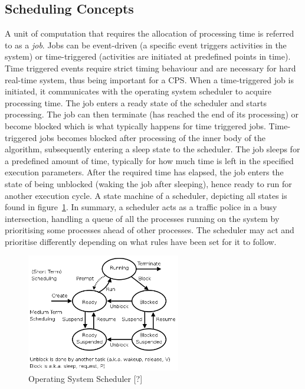 \subsection{Scheduling Concepts}
A unit of computation that requires the allocation of processing time is referred to as a \textit{job}. Jobs can be event-driven (a specific event triggers activities in the system) or time-triggered (activities are initiated at predefined points in time). Time triggered events require strict timing behaviour and are necessary for hard real-time system, thus being important for a CPS. When a time-triggered job is initiated, it communicates with the operating system scheduler to acquire processing time. The job enters a ready state of the scheduler and starts processing. The job can then terminate (has reached the end of its processing) or become blocked which is what typically happens for time triggered jobs. Time-triggered jobs becomes blocked after processing of the inner body of the algorithm, subsequently entering a sleep state to the scheduler. The job sleeps for a predefined amount of time, typically for how much time is left in the specified execution parameters. After the required time has elapsed, the job enters the state of being unblocked (waking the job after sleeping), hence ready to run for another execution cycle. A state machine of a scheduler, depicting all states is found in figure~\ref{scheduler}. In summary, a scheduler acts as a traffic police in a busy intersection, handling a queue of all the processes running on the system by prioritising some processes ahead of other processes. The scheduler may act and prioritise differently depending on what rules have been set for it to follow.\\         


\begin{figure}[ht]
\centering
     \includegraphics[width=0.6\textwidth]{./figure/scheduling.png}
      \caption{Operating System Scheduler [?]}
       \label{scheduler}
\end{figure}



